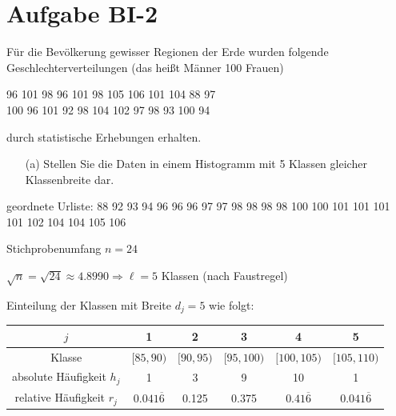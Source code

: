 
\section{Aufgabe BI-2}

\begin{task}
    Für die Bevölkerung gewisser Regionen der Erde wurden folgende Geschlechterverteilungen (das heißt Männer 100 Frauen)
    \begin{tightcenter}
        96  101  98  96  101  98  105  106  101  104  88  97 \\
        100  96  101  92  98  104  102  97  98  93  100  94
    \end{tightcenter}
    durch statistische Erhebungen erhalten.

    \begin{enumerate}
        \item[(a)] Stellen Sie die Daten in einem Histogramm mit 5 Klassen gleicher Klassenbreite dar.
    \end{enumerate}
\end{task}

geordnete Urliste: 88 92 93 94 96 96 96 97 97 98 98 98 98 100 100 101 101 101 101 102 104 104 105 106

Stichprobenumfang $n=24$

$\sqrt{n} = \sqrt{24} \approx 4.8990 \Rightarrow \ell=5$ Klassen (nach Faustregel)

Einteilung der Klassen mit Breite $d_j=5$ wie folgt:
\nopagebreak
\begin{table}[H]
\centering
\begin{tabular}{c|ccccc}
    $j$                       & 1                   & 2         & 3          & 4                  & 5                   \\ \hline
    Klasse                    & $[85,90)$           & $[90,95)$ & $[95,100)$ & $[100,105)$        & $[105,110)$         \\
    absolute Häufigkeit $h_j$ & 1                   & 3         & 9          & 10                 & 1                   \\
    relative Häufigkeit $r_j$ & $0.041\overline{6}$ & 0.125     & 0.375      & $0.41\overline{6}$ & $0.041\overline{6}$
\end{tabular}
\end{table}

